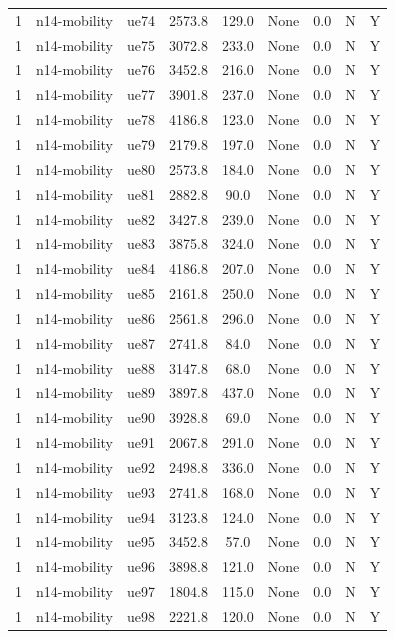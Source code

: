 \begin{table}[ht]
\begin{tabular}{|c|c|c|c|c|c|c|c|c|}
1 & n14-mobility & ue74 & 2573.8 & 129.0 & None & 0.0 & N & Y \\
1 & n14-mobility & ue75 & 3072.8 & 233.0 & None & 0.0 & N & Y \\
1 & n14-mobility & ue76 & 3452.8 & 216.0 & None & 0.0 & N & Y \\
1 & n14-mobility & ue77 & 3901.8 & 237.0 & None & 0.0 & N & Y \\
1 & n14-mobility & ue78 & 4186.8 & 123.0 & None & 0.0 & N & Y \\
1 & n14-mobility & ue79 & 2179.8 & 197.0 & None & 0.0 & N & Y \\
1 & n14-mobility & ue80 & 2573.8 & 184.0 & None & 0.0 & N & Y \\
1 & n14-mobility & ue81 & 2882.8 & 90.0 & None & 0.0 & N & Y \\
1 & n14-mobility & ue82 & 3427.8 & 239.0 & None & 0.0 & N & Y \\
1 & n14-mobility & ue83 & 3875.8 & 324.0 & None & 0.0 & N & Y \\
1 & n14-mobility & ue84 & 4186.8 & 207.0 & None & 0.0 & N & Y \\
1 & n14-mobility & ue85 & 2161.8 & 250.0 & None & 0.0 & N & Y \\
1 & n14-mobility & ue86 & 2561.8 & 296.0 & None & 0.0 & N & Y \\
1 & n14-mobility & ue87 & 2741.8 & 84.0 & None & 0.0 & N & Y \\
1 & n14-mobility & ue88 & 3147.8 & 68.0 & None & 0.0 & N & Y \\
1 & n14-mobility & ue89 & 3897.8 & 437.0 & None & 0.0 & N & Y \\
1 & n14-mobility & ue90 & 3928.8 & 69.0 & None & 0.0 & N & Y \\
1 & n14-mobility & ue91 & 2067.8 & 291.0 & None & 0.0 & N & Y \\
1 & n14-mobility & ue92 & 2498.8 & 336.0 & None & 0.0 & N & Y \\
1 & n14-mobility & ue93 & 2741.8 & 168.0 & None & 0.0 & N & Y \\
1 & n14-mobility & ue94 & 3123.8 & 124.0 & None & 0.0 & N & Y \\
1 & n14-mobility & ue95 & 3452.8 & 57.0 & None & 0.0 & N & Y \\
1 & n14-mobility & ue96 & 3898.8 & 121.0 & None & 0.0 & N & Y \\
1 & n14-mobility & ue97 & 1804.8 & 115.0 & None & 0.0 & N & Y \\
1 & n14-mobility & ue98 & 2221.8 & 120.0 & None & 0.0 & N & Y \\

\end{tabular}
\end{table}
